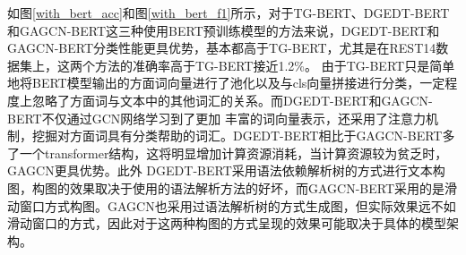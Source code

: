 如图\ref{with_bert_acc}和图\ref{with_bert_f1}所示，对于TG-BERT、DGEDT-BERT和GAGCN-BERT这三种使用BERT预训练模型的方法来说，DGEDT-BERT和GAGCN-BERT分类性能更具优势，基本都高于TG-BERT，尤其是在REST14数据集上，这两个方法的准确率高于TG-BERT接近1.2\%。
由于TG-BERT只是简单地将BERT模型输出的方面词向量进行了池化以及与cls向量拼接进行分类，一定程度上忽略了方面词与文本中的其他词汇的关系。而DGEDT-BERT和GAGCN-BERT不仅通过GCN网络学习到了更加
丰富的词向量表示，还采用了注意力机制，挖掘对方面词具有分类帮助的词汇。DGEDT-BERT相比于GAGCN-BERT多了一个transformer结构，这将明显增加计算资源消耗，当计算资源较为贫乏时，GAGCN更具优势。此外
DGEDT-BERT采用语法依赖解析树的方式进行文本构图，构图的效果取决于使用的语法解析方法的好坏，而GAGCN-BERT采用的是滑动窗口方式构图。GAGCN也采用过语法解析树的方式生成图，但实际效果远不如
滑动窗口的方式，因此对于这两种构图的方式呈现的效果可能取决于具体的模型架构。

